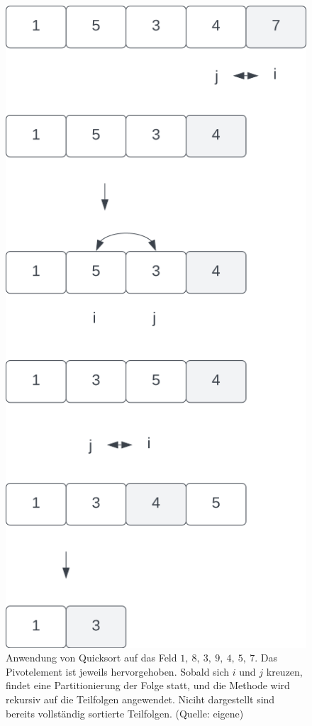 \begin{figure}
\begin{center}
    \end{center}
    \begin{center}
        \includegraphics[scale=0.3]{chapters/Sortierverfahren/img/quicksort2}
        \caption{Anwendung von Quicksort auf das Feld $1,\ 8,\ 3,\ 9,\ 4,\ 5,\ 7$. Das Pivotelement ist jeweils hervorgehoben. Sobald sich $i$ und $j$ kreuzen, findet eine Partitionierung der Folge statt, und die Methode wird rekursiv auf die Teilfolgen angewendet. Niciht dargestellt sind bereits vollständig sortierte Teilfolgen. (Quelle: eigene)}
        \label{fig:quicksort}
    \end{center}
\end{figure}


